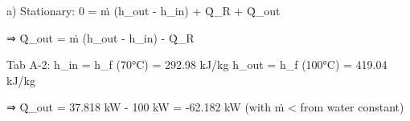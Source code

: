 a) Stationary:  
0 = ṁ (h_out - h_in) + Q̇_R + Q̇_out  

⇒ Q̇_out = ṁ (h_out - h_in) - Q̇_R  

Tab A-2:  
h_in = h_f (70°C) = 292.98 kJ/kg  
h_out = h_f (100°C) = 419.04 kJ/kg  

⇒ Q̇_out = 37.818 kW - 100 kW = -62.182 kW  
(with ṁ < from water constant)